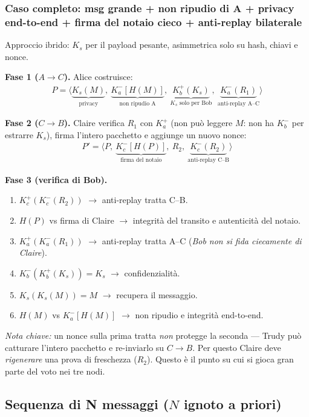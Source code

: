 \documentclass[11pt,a4paper]{report}
\begin{document}
\subsubsection*{Caso completo: msg grande + non ripudio di A + privacy end-to-end
+ firma del notaio cieco + anti-replay bilaterale}

Approccio ibrido: $K_s$ per il payload pesante, asimmetrica solo su hash, chiavi e
nonce.

\noindent\textbf{Fase 1 ($A \to C$).} Alice costruisce:
\begin{align*}
  P = \Big\langle \underbrace{K_s(M)}_\text{privacy},\ \underbrace{K_a^-[H(M)]}_\text{non ripudio A},\ \underbrace{K_b^+(K_s)}_\text{$K_s$ solo per Bob},\ \underbrace{K_a^-(R_1)}_\text{anti-replay A--C} \Big\rangle
\end{align*}

\noindent\textbf{Fase 2 ($C \to B$).} Claire verifica $R_1$ con $K_a^+$ (non può
leggere $M$: non ha $K_b^-$ per estrarre $K_s$), firma l'intero pacchetto e
aggiunge un nuovo nonce:
\begin{align*}
  P' = \Big\langle P,\ \underbrace{K_c^-[H(P)]}_\text{firma del notaio},\ R_2,\ \underbrace{K_c^-(R_2)}_\text{anti-replay C--B} \Big\rangle
\end{align*}

\noindent\textbf{Fase 3 (verifica di Bob).}
\begin{enumerate}[noitemsep]
\item $K_c^+(K_c^-(R_2))$ $\to$ anti-replay tratta C--B.
\item $H(P)$ vs firma di Claire $\to$ integrità del transito e autenticità del notaio.
\item $K_a^+(K_a^-(R_1))$ $\to$ anti-replay tratta A--C (\emph{Bob non si fida
ciecamente di Claire}).
\item $K_b^-(K_b^+(K_s)) = K_s$ $\to$ confidenzialità.
\item $K_s(K_s(M)) = M$ $\to$ recupera il messaggio.
\item $H(M)$ vs $K_a^-[H(M)]$ $\to$ non ripudio e integrità end-to-end.
\end{enumerate}

\textit{Nota chiave:} un nonce sulla prima tratta \emph{non} protegge la seconda
--- Trudy può catturare l'intero pacchetto e re-inviarlo su $C\to B$. Per questo
Claire deve \emph{rigenerare} una prova di freschezza ($R_2$). Questo è il punto su
cui si gioca gran parte del voto nei tre nodi.

\subsection{Sequenza di N messaggi ($N$ ignoto a priori)}
\end{document}
